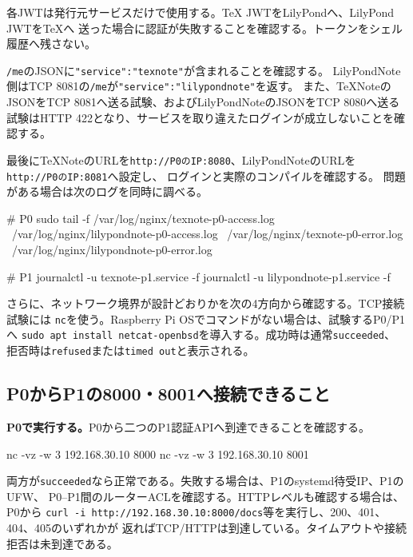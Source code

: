 \documentclass[uplatex,a4paper,11pt]{jsarticle}
\begin{document}
各JWTは発行元サービスだけで使用する。TeX JWTをLilyPondへ、LilyPond JWTをTeXへ
送った場合に認証が失敗することを確認する。トークンをシェル履歴へ残さない。


\texttt{/me}のJSONに\texttt{"service":"texnote"}が含まれることを確認する。
LilyPondNote側はTCP 8081の\texttt{/me}が\texttt{"service":"lilypondnote"}を返す。
また、TeXNoteのJSONをTCP 8081へ送る試験、およびLilyPondNoteのJSONをTCP 8080へ送る
試験はHTTP 422となり、サービスを取り違えたログインが成立しないことを確認する。

最後にTeXNoteのURLを\texttt{http://P0のIP:8080}、LilyPondNoteのURLを
\texttt{http://P0のIP:8081}へ設定し、
ログインと実際のコンパイルを確認する。
問題がある場合は次のログを同時に調べる。

\begin{command}
# P0
sudo tail -f /var/log/nginx/texnote-p0-access.log \
  /var/log/nginx/lilypondnote-p0-access.log \
  /var/log/nginx/texnote-p0-error.log \
  /var/log/nginx/lilypondnote-p0-error.log

# P1
journalctl -u texnote-p1.service -f
journalctl -u lilypondnote-p1.service -f
\end{command}

さらに、ネットワーク境界が設計どおりかを次の4方向から確認する。TCP接続試験には
\texttt{nc}を使う。Raspberry Pi OSでコマンドがない場合は、試験するP0/P1へ
\texttt{sudo apt install netcat-openbsd}を導入する。成功時は通常\texttt{succeeded}、
拒否時は\texttt{refused}または\texttt{timed out}と表示される。

\subsection{P0からP1の8000・8001へ接続できること}

\textbf{P0で実行する。}P0から二つのP1認証APIへ到達できることを確認する。

\begin{command}
nc -vz -w 3 192.168.30.10 8000
nc -vz -w 3 192.168.30.10 8001
\end{command}

両方が\texttt{succeeded}なら正常である。失敗する場合は、P1のsystemd待受IP、P1のUFW、
P0--P1間のルーターACLを確認する。HTTPレベルも確認する場合は、P0から
\texttt{curl -i http://192.168.30.10:8000/docs}等を実行し、200、401、404、405のいずれかが
返ればTCP/HTTPは到達している。タイムアウトや接続拒否は未到達である。
\end{document}
